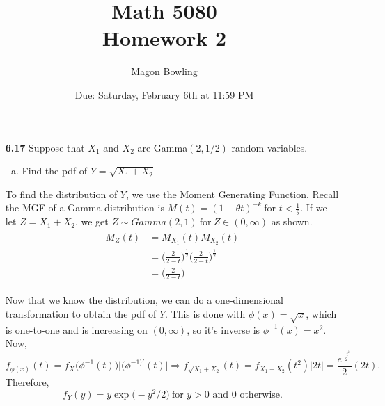 \documentclass[11pt]{article}
\theoremstyle{definition}
\newcommand{\1}[1]{\mathbf{1} \left \{ #1 \right \}}
\begin{document}
\title{Math 5080 \\ Homework 2}
\date{Due: Saturday, February 6th at 11:59 PM}
\author{Magon Bowling}

\maketitle

\begin{itemize}

\item [{\color{red} \textbf{6.17}}] Suppose that $X_1$ and $X_2$ are Gamma$(2, 1/2)$ random variables.
\begin{enumerate}[(a)]
\item Find the pdf of $Y = \sqrt{X_1 + X_2}$
\end{enumerate}
To find the distribution of $Y$, we use the Moment Generating Function.  Recall the MGF of a Gamma distribution is \(M(t) = (1-\theta t)^{-k} \ \text{for $t < \frac{1}{\theta}$}\).  If we let $Z = X_1 + X_2$, we get $Z \sim Gamma(2,1) \ \text{for} \ Z \in (0,\infty)$ as shown.
\begin{align*}
    \begin{split}
        M_Z(t) &= M_{X_1}(t)M_{X_2}(t) \\
        &= \bigg(\frac{2}{2 - t}\bigg)^{\frac{1}{2}} \bigg(\frac{2}{2 - t}\bigg)^{\frac{1}{2}} \\
        &= \bigg(\frac{2}{2 - t}\bigg)
    \end{split}
\end{align*}

Now that we know the distribution, we can do a one-dimensional transformation to obtain the pdf of $Y$.  This is done with \(\phi(x) = \sqrt{x} \), which is one-to-one and is increasing on $(0,\infty)$, so it's inverse is \(\phi^{-1}(x) = x^2\).  Now,
\[f_{\phi (x)} (t) = f_X \big(\phi^{-1}(t)\big) \Big|(\phi^{-1)\prime}(t)\Big| \Rightarrow f_{\sqrt{X_1 + X_2}} (t) = f_{X_1 + X_2} (t^2)|2t| = \frac{e^{\frac{-t^2}{2}}}{2} (2t).\]
Therefore,
\[f_Y (y) = y \exp\big(-y^2/2\big) \ \text{for $y>0$ and $0$ otherwise.}\]


\end{itemize}
\end{document}
